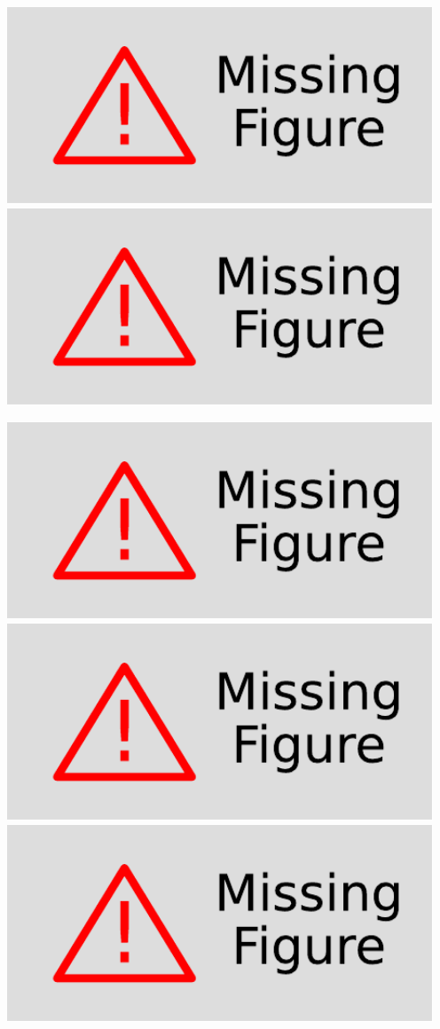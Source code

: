 \documentclass{article}
\begin{document}
\includegraphics[width=5in]{images/pdf/missingfig.pdf}
\includegraphics[width=5in]{missingfig.pdf}

\graphicspath{
  {images/}
  {images/pdf/}
}

\includegraphics[width=5in]{images/pdf/missingfig.pdf}
\includegraphics[width=5in]{pdf/missingfig.pdf}
\includegraphics[width=5in]{missingfig.pdf}
\end{document}
